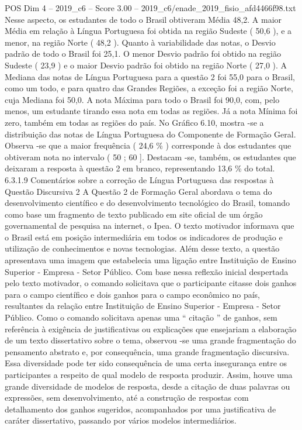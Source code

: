 \begin{textsample}{POS Dim 4 – 2019\_c6 – Score 3.00 – 2019\_c6/enade\_2019\_fisio\_afd4466f98.txt}
Nesse aspecto, os estudantes de todo o Brasil obtiveram Média 48,2.
A maior Média em relação à Língua Portuguesa foi obtida na região Sudeste ( 50,6 ), e a menor, na região Norte ( 48,2 ).
Quanto à variabilidade das notas, o Desvio padrão de todo o Brasil foi 25,1.
O menor Desvio padrão foi obtido na região Sudeste ( 23,9 ) e o maior Desvio padrão foi obtido na região Norte ( 27,0 ).
A Mediana das notas de Língua Portuguesa para a questão 2 foi 55,0 para o Brasil, como um todo, e para quatro das Grandes Regiões, a exceção foi a região Norte, cuja Mediana foi 50,0.
A nota Máxima para todo o Brasil foi 90,0, com, pelo menos, um estudante tirando essa nota em todas as regiões.
Já a nota Mínima foi zero, também em todas as regiões do país.
No Gráfico 6.10, mostra -se a distribuição das notas de Língua Portuguesa do Componente de Formação Geral.
Observa -se que a maior frequência ( 24,6 \% ) corresponde à dos estudantes que obtiveram nota no intervalo ( 50 ; 60 ].
Destacam -se, também, os estudantes que deixaram a resposta à questão 2 em branco, representando 13,6 \% do total. 6.3.1.9 Comentários sobre a correção de Língua Portuguesa das respostas à Questão Discursiva 2 A Questão 2 de Formação Geral abordava o tema do desenvolvimento científico e do desenvolvimento tecnológico do Brasil, tomando como base um fragmento de texto publicado em site oficial de um órgão governamental de pesquisa na internet, o Ipea.
O texto motivador informava que o Brasil está em posição intermediária em todos os indicadores de produção e utilização de conhecimentos e novas tecnologias.
Além desse texto, a questão apresentava uma imagem que estabelecia uma ligação entre Instituição de Ensino Superior - Empresa - Setor Público.
Com base nessa reflexão inicial despertada pelo texto motivador, o comando solicitava que o participante citasse dois ganhos para o campo científico e dois ganhos para o campo econômico no país, resultantes da relação entre Instituição de Ensino Superior - Empresa - Setor Público.
Como o comando solicitava apenas uma “ citação ” de ganhos, sem referência à exigência de justificativas ou explicações que ensejariam a elaboração de um texto dissertativo sobre o tema, observou -se uma grande fragmentação do pensamento abstrato e, por consequência, uma grande fragmentação discursiva.
Essa diversidade pode ter sido consequência de uma certa insegurança entre os participantes a respeito de qual modelo de resposta produzir.
Assim, houve uma grande diversidade de modelos de resposta, desde a citação de duas palavras ou expressões, sem desenvolvimento, até a construção de respostas com detalhamento dos ganhos sugeridos, acompanhados por uma justificativa de caráter dissertativo, passando por vários modelos intermediários.

\end{textsample}
